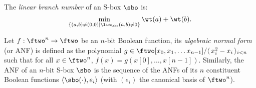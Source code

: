 \begin{defi}
The \emph{linear branch number} of an S-box $\sbo$ is:
\[
\min_{\{(a,b) \neq (0,0) | \lin_{\sbo}(a,b) \neq 0\}} \wt(a) + \wt(b).
\]

\end{defi}

\begin{defi}
Let $f : \ftwo^n \rightarrow \ftwo$ be an $n$-bit Boolean function, its \emph{algebraic normal form}
(or ANF) is defined as the polynomial $g \in \ftwo[x_0,x_1,\ldots x_{n-1}]/\langle\,x_i^2-x_i\,\rangle_{i<n}$
such that for all $x \in \ftwo^n$, $f(x) = g(x[0],\ldots,\allowbreak x[n-1])$.
Similarly, the ANF of an $n$-bit S-box $\sbo$ 
is the sequence of the ANFs of its $n$ constituent Boolean
functions $\langle\sbo(\cdot),e_i\rangle$ (with $(e_i)$ the canonical basis of $\ftwo^n$).
\end{defi}

